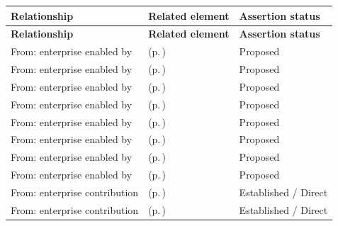 \begingroup\small\setlength{\TableWidth}{\dimexpr\linewidth-6\tabcolsep-4\arrayrulewidth\relax}
\begin{longtable}{|>{\raggedright\arraybackslash}p{0.27\TableWidth}|>{\raggedright\arraybackslash}p{0.48\TableWidth}|>{\raggedright\arraybackslash}p{0.25\TableWidth}|}
\hline\rowcolor{TableHead}\textbf{Relationship} & \textbf{Related element} & \textbf{Assertion status}\\\hline\endfirsthead
\hline\rowcolor{TableHead}\textbf{Relationship} & \textbf{Related element} & \textbf{Assertion status}\\\hline\endhead
\hline\endfoot
From: enterprise enabled by & \nameref{cap:bec-client-privacy} (p.\,\pageref{cap:bec-client-privacy}) & Proposed\\\hline
From: enterprise enabled by & \nameref{cap:bec-health-information-control} (p.\,\pageref{cap:bec-health-information-control}) & Proposed\\\hline
From: enterprise enabled by & \nameref{cap:bec-health-information-access} (p.\,\pageref{cap:bec-health-information-access}) & Proposed\\\hline
From: enterprise enabled by & \nameref{cap:bec-clinical-knowledge-services} (p.\,\pageref{cap:bec-clinical-knowledge-services}) & Proposed\\\hline
From: enterprise enabled by & \nameref{cap:bec-on-call-management} (p.\,\pageref{cap:bec-on-call-management}) & Proposed\\\hline
From: enterprise enabled by & \nameref{cap:bec-clinical-collaboration} (p.\,\pageref{cap:bec-clinical-collaboration}) & Proposed\\\hline
From: enterprise enabled by & \nameref{cap:bec-general-collaboration} (p.\,\pageref{cap:bec-general-collaboration}) & Proposed\\\hline
From: enterprise enabled by & \nameref{cap:bec-presentation-services} (p.\,\pageref{cap:bec-presentation-services}) & Proposed\\\hline
From: enterprise contribution & \nameref{cap:bec-assurance-design} (p.\,\pageref{cap:bec-assurance-design}) & Established / Direct\\\hline
From: enterprise contribution & \nameref{cap:bec-assurance-criteria-management} (p.\,\pageref{cap:bec-assurance-criteria-management}) & Established / Direct\\\hline
\end{longtable}\endgroup

